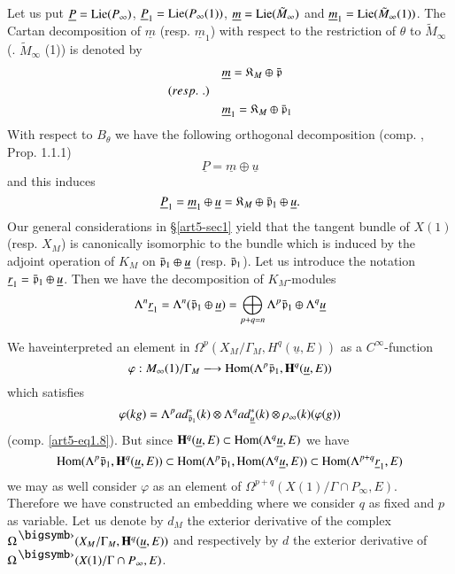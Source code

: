 Let us put $\underline{P} = \operatorname{Lie} (P_\infty)$, $\underline{P}_1 = \operatorname{Lie} (P_\infty (1))$, $\underline{m} = \operatorname{Lie} (\tilde{M}_\infty)$ and $\underline{m}_1 = \operatorname{Lie} (\tilde{M}_\infty (1))$. The Cartan decomposition of $\underline{m}$ (resp. $\underline{m}_1$) with respect to the restriction of $\theta$ to $\tilde{M}_\infty$ (\resp. $\tilde{M}_\infty$ (1)) is denoted by 
\begin{align*}
& \underline{m} = \mathfrak{K}_M \oplus \bar{\mathfrak{p}}\\
({resp.}\kern.3em.) \quad & \\
& \underline{m}_1 = \mathfrak{K}_M \oplus \bar{\mathfrak{p}}_1
\end{align*}
With respect to $B_\theta$ we have the following orthogonal decomposition (comp. \cite{art5-key6}, Prop. 1.1.1)
$$
\underline{P} = \underline{m} \oplus \underline{u}
$$
and this induces 
$$
\underline{P}_1 = \underline{m}_1 \oplus \underline{u} = \mathfrak{K}_M \oplus \bar{\mathfrak{p}}_1 \oplus \underline{u}.
$$
Our general considerations in \S \ref{art5-sec1} yield that the tangent bundle of $X(1)$ (resp. $X_M$) is canonically isomorphic to the bundle which is induced by the adjoint operation of $K_M$ on $\bar{\mathfrak{p}}_1 \oplus \underline{u}$ (resp. $\bar{\mathfrak{p}}_1$). Let us introduce the notation $\underline{r}_1 = \bar{\mathfrak{p}}_1 \oplus \underline{u}$. Then we have the decomposition of $K_M$-modules
$$
\Lambda^n \underline{r}_1 = \Lambda^n (\bar{\mathfrak{p}}_1 \oplus \underline{u}) = \bigoplus_{p+q=n} \Lambda^p \bar{\mathfrak{p}}_1 \oplus \Lambda^q \underline{u}
$$

We have\pageoriginale interpreted an element in $\Omega^p (X_M/ \Gamma_M, H^q (\underline{u}, E))$ as a $C^\infty$-function
$$
\varphi : M_\infty (1) / \Gamma_M \longrightarrow \operatorname{Hom} (\Lambda^p \bar{\mathfrak{p}}_1, \mathbf{H}^q (\underline{u}, E))
$$
which satisfies 
$$
\varphi (kg) = \Lambda^p ad^\ast_{\bar{\mathfrak{p}}_1} (k)\otimes \Lambda^q ad^\ast_{\underline{u}} (k) \otimes \rho_\infty (k) (\varphi (g))
 $$ 
(comp. \eqref{art5-eq1.8}). But since $\mathbf{H}^q (\underline{u}, E) \subset \operatorname{Hom} (\Lambda^q \underline{u}, E)$ we have 
$$
\operatorname{Hom} (\Lambda^p \bar{\mathfrak{p}}_1, \mathbf{H}^q (\underline{u}, E)) \subset \operatorname{Hom} (\Lambda^p \bar{\mathfrak{p}}_1, \operatorname{Hom} (\Lambda^q \underline{u}, E)) \subset \operatorname{Hom} (\Lambda^{p+q}  \underline{r}_1, E)
$$
we may as well consider $\varphi$ as an element of $\Omega^{p+q} (X (1)/ \Gamma \cap P_\infty, E)$. Therefore we have constructed an embedding where we consider $q$ as fixed and $p$ as variable. Let us denote by $d_M$ the exterior derivative of the complex $\Omega^\bigdot (X_M / \Gamma _M, \bH^q (\underline{u}, E))$ and respectively by $d$ the exterior derivative of $\Omega^\bigdot (X (1)/ \Gamma \cap P_\infty, E)$.


